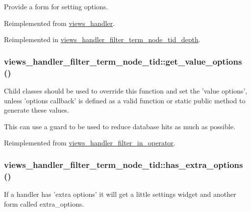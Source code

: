 Provide a form for setting options. 

Reimplemented from \hyperlink{classviews__handler_0eed1d12c47d60190f59e135d962719e}{views\_\-handler}.

Reimplemented in \hyperlink{classviews__handler__filter__term__node__tid__depth_704c5e42a5a41ee12bd01b1b153431e4}{views\_\-handler\_\-filter\_\-term\_\-node\_\-tid\_\-depth}.\hypertarget{classviews__handler__filter__term__node__tid_78e569201a5b833da4aafbf325a77c44}{
\subsubsection[{get\_\-value\_\-options}]{\setlength{\rightskip}{0pt plus 5cm}views\_\-handler\_\-filter\_\-term\_\-node\_\-tid::get\_\-value\_\-options ()}}
\label{classviews__handler__filter__term__node__tid_78e569201a5b833da4aafbf325a77c44}


Child classes should be used to override this function and set the 'value options', unless 'options callback' is defined as a valid function or static public method to generate these values.

This can use a guard to be used to reduce database hits as much as possible. 

Reimplemented from \hyperlink{classviews__handler__filter__in__operator_a5b5df6d90f4359ed28c0c446bdc81a6}{views\_\-handler\_\-filter\_\-in\_\-operator}.\hypertarget{classviews__handler__filter__term__node__tid_72232eda675756741ce92061cb4685ee}{
\subsubsection[{has\_\-extra\_\-options}]{\setlength{\rightskip}{0pt plus 5cm}views\_\-handler\_\-filter\_\-term\_\-node\_\-tid::has\_\-extra\_\-options ()}}
\label{classviews__handler__filter__term__node__tid_72232eda675756741ce92061cb4685ee}


If a handler has 'extra options' it will get a little settings widget and another form called extra\_\-options. 

